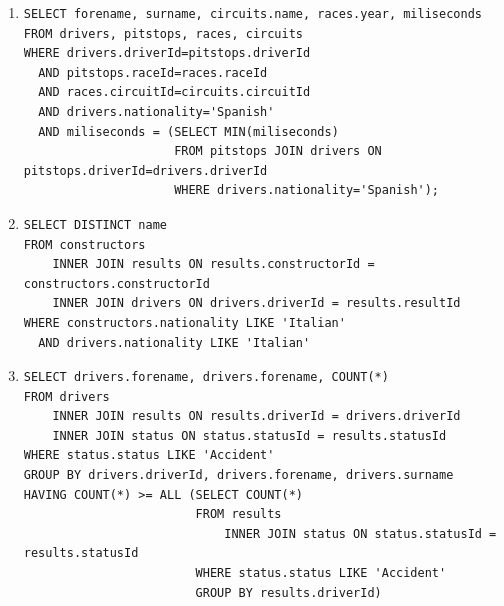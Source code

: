 \documentclass[a4paper]{article}
\begin{document}
\begin{enumerate}
    \item %
    \begin{verbatim}  
SELECT forename, surname, circuits.name, races.year, miliseconds
FROM drivers, pitstops, races, circuits
WHERE drivers.driverId=pitstops.driverId 
  AND pitstops.raceId=races.raceId
  AND races.circuitId=circuits.circuitId
  AND drivers.nationality='Spanish'
  AND miliseconds = (SELECT MIN(miliseconds)
                     FROM pitstops JOIN drivers ON pitstops.driverId=drivers.driverId
                     WHERE drivers.nationality='Spanish');
    \end{verbatim}
     
    \item %
    \begin{verbatim}  
SELECT DISTINCT name
FROM constructors
    INNER JOIN results ON results.constructorId = constructors.constructorId
    INNER JOIN drivers ON drivers.driverId = results.resultId
WHERE constructors.nationality LIKE 'Italian'
  AND drivers.nationality LIKE 'Italian'
    \end{verbatim}
            
    \item %
    \begin{verbatim}  
SELECT drivers.forename, drivers.forename, COUNT(*)
FROM drivers
	INNER JOIN results ON results.driverId = drivers.driverId
    INNER JOIN status ON status.statusId = results.statusId
WHERE status.status LIKE 'Accident'
GROUP BY drivers.driverId, drivers.forename, drivers.surname
HAVING COUNT(*) >= ALL (SELECT COUNT(*)
                        FROM results
                        	INNER JOIN status ON status.statusId = results.statusId
                        WHERE status.status LIKE 'Accident'
                        GROUP BY results.driverId) 
    \end{verbatim}
            

\end{enumerate}
\end{document}
